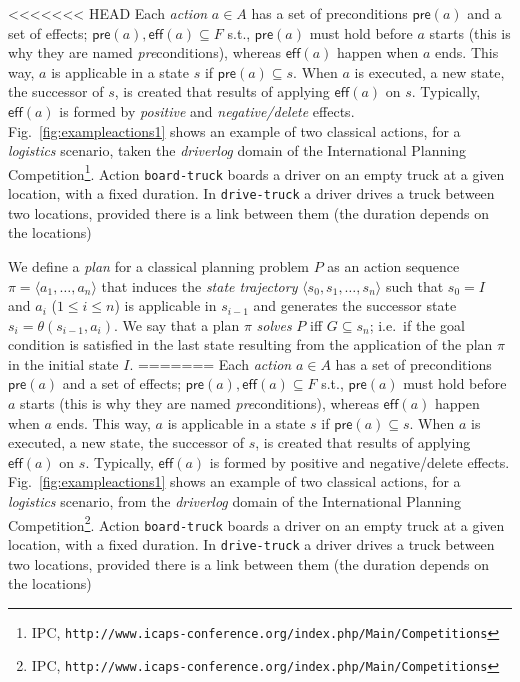 \documentclass[runningheads]{llncs}
\newcommand{\tup}[1]{{\langle #1 \rangle}}
\newcommand{\pre}{\mathsf{pre}}    %
\newcommand{\eff}{\mathsf{eff}}    %
\begin{document}
<<<<<<< HEAD
Each {\em action} $a \in A$ has a set of preconditions $\pre(a)$ and a set of effects; $\pre(a), \eff(a) \subseteq F$ s.t., $\pre(a)$ must hold before $a$ starts (this is why they are named \emph{pre}conditions), whereas $\eff(a)$ happen when $a$ ends. This way, $a$ is applicable in a state $s$ if $\pre(a) \subseteq s$. When $a$ is executed, a new state, the successor of $s$, is created that results of applying $\eff(a)$ on $s$. Typically, $\eff(a)$ is formed by {\em positive} and {\em negative/delete} effects. Fig.~\ref{fig:exampleactions1} shows an example of two classical actions, for a {\em logistics} scenario, taken the \emph{driverlog} domain of the International Planning Competition\footnote{IPC, \texttt{http://www.icaps-conference.org/index.php/Main/Competitions}}. Action \texttt{board-truck} boards a driver on an empty truck at a given location, with a fixed duration. In \texttt{drive-truck} a driver drives a truck between two locations, provided there is a link between them (the duration depends on the locations)

We define a {\em plan} for a classical planning problem $P$ as an action sequence $\pi=\tup{a_1, \ldots, a_n}$ that induces the {\em state trajectory} $\tup{s_0, s_1, \ldots, s_n}$ such that $s_0=I$ and $a_i$ ({\small $1\leq i\leq n$}) is applicable in $s_{i-1}$ and generates the successor state $s_i=\theta(s_{i-1},a_i)$. We say that a plan $\pi$ {\em solves} $P$ iff $G\subseteq s_n$; i.e.~if the goal condition is satisfied in the last state resulting from the application of the plan $\pi$ in the initial state $I$.
=======
Each {\em action} $a \in A$ has a set of preconditions $\pre(a)$ and a set of effects; $\pre(a), \eff(a) \subseteq F$ s.t., $\pre(a)$ must hold before $a$ starts (this is why they are named \emph{pre}conditions), whereas $\eff(a)$ happen when $a$ ends. This way, $a$ is applicable in a state $s$ if $\pre(a) \subseteq s$. When $a$ is executed, a new state, the successor of $s$, is created that results of applying $\eff(a)$ on $s$. Typically, $\eff(a)$ is formed by positive and negative/delete effects. Fig.~\ref{fig:exampleactions1} shows an example of two classical actions, for a {\em logistics} scenario, from the \emph{driverlog} domain of the International Planning Competition\footnote{IPC, \texttt{http://www.icaps-conference.org/index.php/Main/Competitions}}. Action \texttt{board-truck} boards a driver on an empty truck at a given location, with a fixed duration. In \texttt{drive-truck} a driver drives a truck between two locations, provided there is a link between them (the duration depends on the locations)
\end{document}
